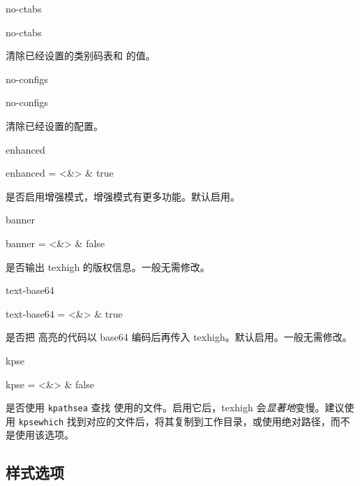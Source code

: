 \documentclass[class=article,openany]{cusdoc}[2025/09/29]
\begin{document}
\begin{keyval}[path=high]{no-ctabs}
  \begin{syntax}
    no-ctabs
  \end{syntax}
清除已经设置的类别码表和  的值。
\end{keyval}

\begin{keyval}[path=high]{no-configs}
  \begin{syntax}
    no-configs
  \end{syntax}
清除已经设置的配置。
\end{keyval}

\begin{keyval}[path=high]{enhanced}
  \begin{syntax}
    enhanced = <&\TTF> & true
  \end{syntax}
是否启用增强模式，增强模式有更多功能。默认启用。
\end{keyval}

\begin{keyval}[path=high]{banner}
  \begin{syntax}
    banner = <&\TTF> & false
  \end{syntax}
是否输出 texhigh 的版权信息。一般无需修改。
\end{keyval}

\begin{keyval}[path=high]{text-base64}
  \begin{syntax}
    text-base64 = <&\TTF> & true
  \end{syntax}
是否把  高亮的代码以 base64 编码后再传入 texhigh。默认启用。一般无需修改。
\end{keyval}

\begin{keyval}[path=high]{kpse}
  \begin{syntax}
    kpse = <&\TTF> & false
  \end{syntax}
是否使用 \texttt{kpathsea} 查找  使用的文件。启用它后，texhigh 会\emph{显著地}变慢。建议使用 \texttt{kpsewhich} 找到对应的文件后，将其复制到工作目录，或使用绝对路径，而不是使用该选项。
\end{keyval}

\subsection{样式选项}
\end{document}
